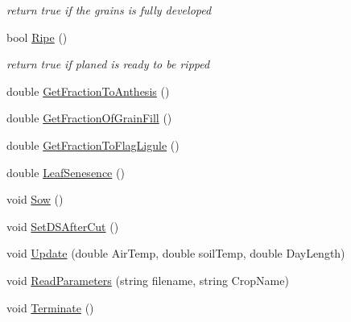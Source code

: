 \begin{DoxyCompactItemize}
\begin{DoxyCompactList}\small\item\em return true if the grains is fully developed \item\end{DoxyCompactList}\item 
bool \hyperlink{classphenology_a906583e45eeda4d8a6e1cec487a272cc}{Ripe} ()
\begin{DoxyCompactList}\small\item\em return true if planed is ready to be ripped \item\end{DoxyCompactList}\item 
double \hyperlink{classphenology_aad2f655d897ddb69dadb719ce046f74f}{GetFractionToAnthesis} ()
\item 
double \hyperlink{classphenology_ae1e41d673ae323dc45240665b167b14e}{GetFractionOfGrainFill} ()
\item 
double \hyperlink{classphenology_a1745a1f68ead72820ce0b9bb3272e7b1}{GetFractionToFlagLigule} ()
\item 
double \hyperlink{classphenology_ad15943ccbe565731b9ddb338ca6384bf}{LeafSenesence} ()
\item 
void \hyperlink{classphenology_a2962099feafa721d4ee6db7131b6ca3e}{Sow} ()
\item 
void \hyperlink{classphenology_aca23c5511f877cde110a2ee69f98463d}{SetDSAfterCut} ()
\item 
void \hyperlink{classphenology_a2e385ad05ba01687483faa3ec7de127c}{Update} (double AirTemp, double soilTemp, double DayLength)
\item 
void \hyperlink{classphenology_ac81575bc5131dfe69ed0a2f98b6b723e}{ReadParameters} (string filename, string CropName)
\item 
void \hyperlink{classphenology_af5db1bbe2f174a1ddef613c908b316a6}{Terminate} ()
\end{DoxyCompactItemize}
